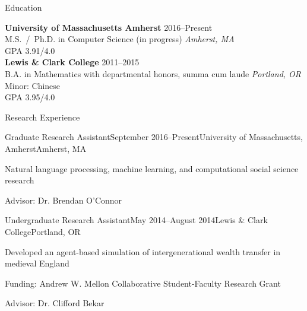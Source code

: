 \documentclass{resume} %
\begin{document}
%


\begin{rSection}{Education}

{\bf University of Massachusetts Amherst} \hfill {2016--Present} \\ 
M.S.~/~Ph.D. in Computer Science (in progress) \hfill {\em Amherst, MA} \\
GPA 3.91/4.0 \\

{\bf Lewis \& Clark College} \hfill {2011--2015} \\ 
B.A. in Mathematics with departmental honors, summa cum laude \hfill {\em Portland, OR} \\
Minor: Chinese \\
GPA 3.95/4.0 \\
\end{rSection}


\begin{rSection}{Research Experience}

\begin{rSubsection}{Graduate Research Assistant}{September 2016--Present}{University of Massachusetts, Amherst}{Amherst, MA}
\item Natural language processing, machine learning, and computational social science research
\item Advisor: Dr. Brendan O'Connor 
\end{rSubsection}


\begin{rSubsection}{Undergraduate Research Assistant}{May 2014--August 2014}{Lewis \& Clark College}{Portland, OR}
\item Developed an agent-based simulation of intergenerational wealth transfer in medieval England
\item Funding: Andrew W. Mellon Collaborative Student-Faculty Research Grant
\item Advisor: Dr. Clifford Bekar
\end{rSubsection}

\end{rSection}
\end{document}
